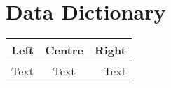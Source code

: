 \chapter{Data Dictionary}


\begin{tabularx}{\textwidth}{L C R}
    \textbf{Left}   & \textbf{Centre}   & \textbf{Right} \\
    \hline
    Text            & Text              & Text
\end{tabularx}
